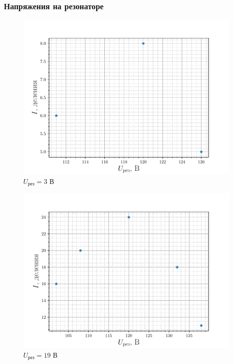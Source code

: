\subsubsection{Напряжения на резонаторе}
\begin{figure}[H]
		\centering
		\includegraphics[height=0.4\textheight]{fig/ref3V_1}
		\caption{$U_{\text{рез}}=3$ В}
		\label{fig:ref3V_2}
\end{figure}
\begin{figure}[H]
		\centering
		\includegraphics[height=0.4\textheight]{fig/ref19V_1}
		\caption{$U_{\text{рез}}=19$ В}
		\label{fig:ref19V_2}
\end{figure}
